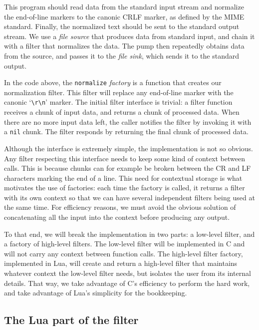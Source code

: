 \documentclass[10pt]{article}
\begin{document}
This program should read data from the standard input stream
and normalize the end-of-line markers to the canonic CRLF
marker, as defined by the MIME standard. Finally, the
normalized text should be sent to the standard output
stream.  We use a \emph{file source} that produces data from
standard input, and chain it with a filter that normalizes
the data. The pump then repeatedly obtains data from the
source, and passes it to the \emph{file sink}, which sends
it to the standard output.

In the code above, the \texttt{normalize} \emph{factory} is a
function that creates our normalization filter. This filter
will replace any end-of-line marker with the canonic
`\verb|\r\n|' marker. The initial filter interface is
trivial: a filter function receives a chunk of input data,
and returns a chunk of processed data.  When there are no
more input data left, the caller notifies the filter by invoking
it with a \texttt{nil} chunk. The filter responds by returning
the final chunk of processed data.

Although the interface is extremely simple, the
implementation is not so obvious. Any filter
respecting this interface needs to keep some kind of context
between calls. This is because chunks can for example be broken 
between the CR and LF characters marking the end of a line.  This
need for contextual storage is what motivates the use of
factories: each time the factory is called, it returns a
filter with its own context so that we can have several
independent filters being used at the same time.  For
efficiency reasons, we must avoid the obvious solution of 
concatenating all the input into the context before
producing any output. 

To that end, we will break the implementation in two parts:
a low-level filter, and a factory of high-level filters. The
low-level filter will be implemented in C and will not carry
any context between function calls. The high-level filter
factory, implemented in Lua, will create and return a
high-level filter that maintains whatever context the low-level
filter needs, but isolates the user from its internal
details. That way, we take advantage of C's efficiency to
perform the hard work, and take advantage of Lua's
simplicity for the bookkeeping.

\subsection{The Lua part of the filter}
\end{document}
